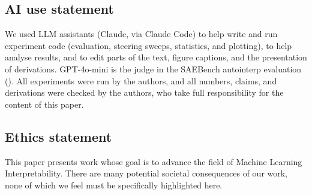 \documentclass{article} %
\theoremstyle{plain}
\theoremstyle{definition}
\theoremstyle{remark}
\begin{document}





\subsection*{AI use statement}
We used LLM assistants (Claude, via Claude Code) to help write and run experiment code (evaluation, steering sweeps, statistics, and plotting), to help analyse results, and to edit parts of the text, figure captions, and the presentation of derivations. GPT-4o-mini is the judge in the SAEBench autointerp evaluation (). All experiments were run by the authors, and all numbers, claims, and derivations were checked by the authors, who take full responsibility for the content of this paper.

\subsection*{Ethics statement}
This paper presents work whose goal is to advance the field of Machine Learning Interpretability. There are many potential societal consequences of our work, none of which we feel must be specifically highlighted here.
\end{document}
